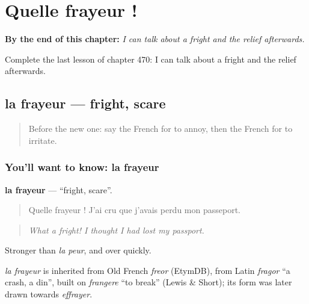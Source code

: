 
\chapter{Quelle frayeur !}
\label{ch:fr-quelle-frayeur}

\begin{chapteropening}
\textbf{By the end of this chapter:} \emph{I can talk about a fright and the relief afterwards.}

Complete the last lesson of chapter 470: I can talk about a fright and the relief afterwards.
\end{chapteropening}

\section[la frayeur]{la frayeur — fright, scare}

\label{lesson:FR-C470-frayeur}



\begin{quote}
Before the new one: say the French for to annoy, then the French for to irritate.
\end{quote}

\subsection*{You'll want to know: la frayeur}
\textbf{la frayeur} — \textquotedblleft{}fright, scare\textquotedblright{}.

\begin{quote}
Quelle frayeur ! J'ai cru que j'avais perdu mon passeport.
\end{quote}

\begin{quote}
\emph{What a fright! I thought I had lost my passport.}
\end{quote}

Stronger than \emph{la peur}, and over quickly.

\begin{cousinweb}
\emph{la frayeur} is inherited from Old French \emph{freor} (EtymDB), from Latin \emph{fragor} \textquotedblleft{}a crash, a din\textquotedblright{}, built on \emph{frangere} \textquotedblleft{}to break\textquotedblright{} (Lewis \& Short); its form was later drawn towards \emph{effrayer}.
\end{cousinweb}


